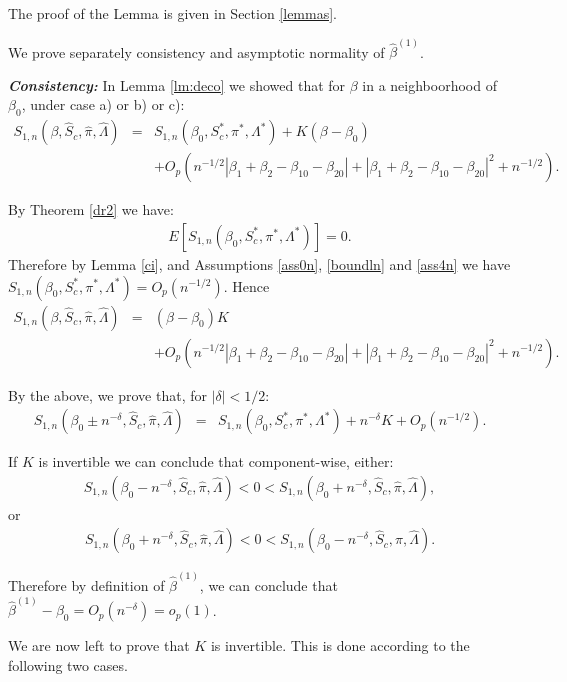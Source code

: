 \documentclass[11pt]{article}
\newcommand{\ee}{\end{eqnarray}}
\newcommand{\eqnn}{\begin{eqnarray*}}
\newcommand{\een}{\end{eqnarray*}}
\newcommand{\be}{\begin{eqnarray}}
\begin{document}
The proof of the Lemma is given in Section \ref{lemmas}.



We prove separately consistency and asymptotic normality of $\hat \beta^{(1)}$.

\textbf{\emph{Consistency:}}
In Lemma \ref{lm:deco} we showed that for ${\beta}$ in a neighboorhood of ${\beta}_0$, under case a) or b) or c):
\eqnn
{S}_{1,n}(\beta, \hat S_c,  \hat \pi, \hat \Lambda)&=&{S}_{1,n}(\beta_0, S^{*}_c,  \pi^{*}, \Lambda^{*})+{K}({\beta}-{\beta}_0)\\
&&+O_p\left(n^{-1/2}\left|\beta_1+\beta_2-\beta_{10}-\beta_{20}\right|+\left|\beta_1+\beta_2-\beta_{10}-\beta_{20}\right|^2+n^{-1/2}\right).\een


By Theorem \ref{dr2} we have: 
\eqnn
E\left[{S}_{1,n}(\beta_0, S^{*}_c,  \pi^{*}, \Lambda^{*})\right]={0}.
\een
Therefore by Lemma \ref{ci}, and Assumptions \ref{ass0n}, \ref{boundln} and \ref{ass4n} we have $S_{1,n}(\beta_0, S^{*}_c,  \pi^{*}, \Lambda^{*})=O_p(n^{-1/2})$.
Hence
\be\label{decocs}
{S}_{1,n}(\beta, \hat S_c,  \hat \pi, \hat \Lambda)&=&({\beta}-{\beta}_0){K}\\
&&+O_p\left(n^{-1/2}\left|\beta_1+\beta_2-\beta_{10}-\beta_{20}\right|+\left|\beta_1+\beta_2-\beta_{10}-\beta_{20}\right|^2+n^{-1/2}\right).\nonumber\ee


By the above, we prove that, for $|\delta|<1/2$:
\eqnn
{S}_{1,n}(\beta_0\pm n^{-\delta}, \hat S_c,  \hat \pi, \hat \Lambda)&=&{S}_{1,n}(\beta_0, S^{*}_c,  \pi^{*}, \Lambda^{*})+n^{-\delta}{K}+O_p(n^{-1/2}).
\een

If ${K}$ is invertible we can conclude that component-wise, either: 
\eqnn
{S}_{1,n}(\beta_0- n^{-\delta}, \hat S_c,  \hat \pi, \hat \Lambda)<{0}<{S}_{1,n}(\beta_0+n^{-\delta}, \hat S_c,  \hat \pi, \hat \Lambda),
\een
or
\eqnn
{S}_{1,n}(\beta_0+ n^{-\delta}, \hat S_c,  \hat \pi, \hat \Lambda)<{0}<{S}_{1,n}(\beta_0-n^{-\delta}, \hat S_c,  \hat \pi, \hat \Lambda).
\een

Therefore by definition of $\hat \beta^{(1)}$, we can conclude that $\hat \beta^{(1)}-{\beta}_0=O_p(n^{-\delta})=o_p(1)$.

We are now left to prove that ${K}$ is invertible. %
This is done according to %
the following two cases.
\end{document}
